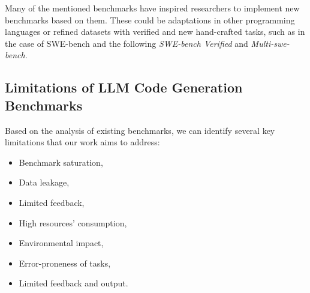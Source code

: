 Many of the mentioned benchmarks have inspired researchers to implement new benchmarks based on them. These could be adaptations in other programming languages or refined datasets with verified and new hand-crafted tasks, such as in the case of SWE-bench and the following \textit{SWE-bench Verified} and \textit{Multi-swe-bench}.




\subsection{Limitations of LLM Code Generation Benchmarks}



Based on the analysis of existing benchmarks, we can identify several key limitations that our work aims to address:
\begin{itemize}
    \item Benchmark saturation,
    \item Data leakage,
    \item Limited feedback,
    \item High resources' consumption,
    \item Environmental impact,
    \item Error-proneness of tasks,
    \item Limited feedback and output.
\end{itemize}

